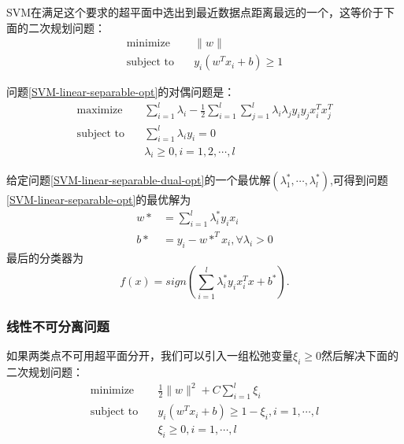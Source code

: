 \documentclass[a4paper,10pt]{article}
\begin{document}
\begin{CJK*}{UTF8}{gbsn}
SVM在满足这个要求的超平面中选出到最近数据点距离最远的一个，这等价于下面的二次规划问题：
\begin{equation}\label{SVM-linear-separable-opt}
\begin{aligned}
\text{minimize} \quad & \| w\|\\
\text{subject to} \quad & y_i(w^T x_i + b) \ge 1
\end{aligned}
\end{equation}

问题\eqref{SVM-linear-separable-opt}的对偶问题是：
\begin{equation}\label{SVM-linear-separable-dual-opt}
\begin{aligned}
\text{maximize} \quad & \sum_{i=1}^l \lambda_i - \frac{1}{2} \sum_{i=1}^l \sum_{j=1}^l \lambda_i\lambda_jy_iy_jx_i^Tx_j^T\\
\text{subject to} \quad & \sum_{i=1}^l \lambda_iy_i =0\\
& \lambda_i \ge 0,  i = 1, 2, \cdots, l
\end{aligned}
\end{equation}

给定问题\eqref{SVM-linear-separable-dual-opt}的一个最优解$(\lambda_1^*, \cdots, \lambda_l^*)$,可得到问题\eqref{SVM-linear-separable-opt}的最优解为
\begin{align*}
w* &= \sum_{i=1}^l \lambda_i^* y_i x_i\\
b* &= y_i - w*^Tx_i, \forall \lambda_i >0
\end{align*}
最后的分类器为
\begin{equation}\label{SVM-linear-separable-classifier}
f(x) = sign(\sum_{i=1}^l \lambda_i^* y_i x_i^T x + b^*).
\end{equation}

\subsubsection{线性不可分离问题}

如果两类点不可用超平面分开，我们可以引入一组松弛变量$\xi_i \ge 0$然后解决下面的二次规划问题：
\begin{equation}\label{SVM-linear-nonseparable-opt}
\begin{aligned}
\text{minimize} \quad & \frac{1}{2}\| w\|^2 + C\sum_{i=1}^l \xi_i \\
\text{subject to} \quad & y_i(w^T x_i + b) \ge 1 - \xi_i, i = 1, \cdots, l\\
& \xi_i \ge 0, i = 1, \cdots, l
\end{aligned}
\end{equation}


\end{CJK*}
\end{document}
